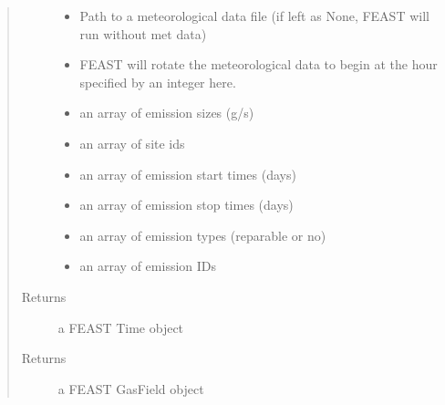 \documentclass[letterpaper,10pt,english]{sphinxmanual}
\begin{document}
\begin{fulllineitems}
\begin{quote}
\begin{description}
\begin{itemize}
\item {} 
 \textendash{} Path to a meteorological data file (if left as None, FEAST will run without met data)

\item {} 
 \textendash{} FEAST will rotate the meteorological data to begin at the hour specified by an integer here.

\item {} 
 \textendash{} an array of emission sizes (g/s)

\item {} 
 \textendash{} an array of site ids

\item {} 
 \textendash{} an array of emission start times (days)

\item {} 
 \textendash{} an array of emission stop times (days)

\item {} 
 \textendash{} an array of emission types (reparable or no)

\item {} 
 \textendash{} an array of emission IDs

\end{itemize}

\item[{Returns}] \leavevmode
a FEAST Time object

\item[{Returns}] \leavevmode
a FEAST GasField object

\end{description}\end{quote}

\end{fulllineitems}

\end{document}
